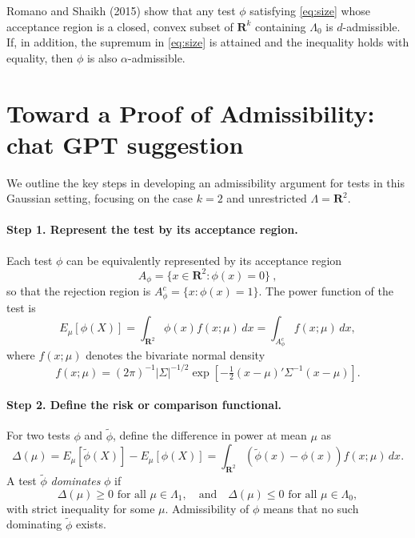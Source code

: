 \documentclass[12pt]{article}
\begin{document}
Romano and Shaikh (2015) show that any test $\phi$ satisfying \eqref{eq:size} whose acceptance region is a closed, convex subset of $\mathbf{R}^k$ containing $\Lambda_0$ is $d$-admissible.  If, in addition, the supremum in \eqref{eq:size} is attained and the inequality holds with equality, then $\phi$ is also $\alpha$-admissible.

\bigskip
\section*{Toward a Proof of Admissibility: chat GPT suggestion}

We outline the key steps in developing an admissibility argument for tests in this Gaussian setting, focusing on the case $k=2$ and unrestricted $\Lambda = \mathbf{R}^2$.

\paragraph{Step 1. Represent the test by its acceptance region.} Each test $\phi$ can be equivalently represented by its acceptance region
\[
A_\phi = \{ x \in \mathbf{R}^2 : \phi(x) = 0 \}~,
\]
so that the rejection region is $A_\phi^c = \{ x : \phi(x) = 1 \}$.  The power function of the test is
\begin{equation} \label{eq:power}
E_\mu[\phi(X)] = \int_{\mathbf{R}^2} \phi(x) f(x;\mu) \, dx = \int_{A_\phi^c} f(x;\mu) \, dx,
\end{equation}
where $f(x;\mu)$ denotes the bivariate normal density
\begin{equation} \label{eq:normaldensity}
f(x;\mu) = (2\pi)^{-1} |\Sigma|^{-1/2} \exp\left[-\tfrac{1}{2}(x-\mu)'\Sigma^{-1}(x-\mu)\right].
\end{equation}

\paragraph{Step 2. Define the risk or comparison functional.} For two tests $\phi$ and $\tilde \phi$, define the difference in power at mean $\mu$ as
\begin{equation} \label{eq:deltamu}
\Delta(\mu) = E_\mu[\tilde \phi(X)] - E_\mu[\phi(X)] = \int_{\mathbf{R}^2} (\tilde \phi(x) - \phi(x)) f(x;\mu)\, dx.
\end{equation}
A test $\tilde \phi$ \emph{dominates} $\phi$ if
\[
\Delta(\mu) \ge 0 \text{ for all } \mu \in \Lambda_1, \quad \text{and} \quad \Delta(\mu) \le 0 \text{ for all } \mu \in \Lambda_0,
\]
with strict inequality for some $\mu$. Admissibility of $\phi$ means that no such dominating $\tilde \phi$ exists.
\end{document}
